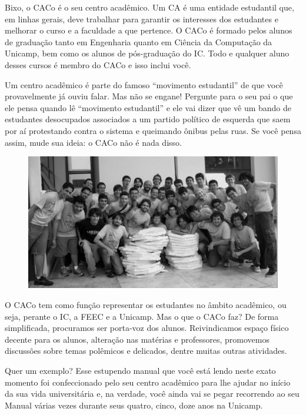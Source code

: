 Bixo, o CACo é o seu centro acadêmico. Um CA é uma entidade estudantil que, em
linhas gerais, deve trabalhar para garantir os interesses dos estudantes e
melhorar o curso e a faculdade a que pertence. O CACo é formado pelos alunos
de graduação tanto em Engenharia quanto em Ciência da Computação da Unicamp,
bem como os alunos de pós-graduação do IC. Todo e qualquer aluno desses cursos
é membro do CACo e isso inclui você.

Um centro acadêmico é parte do famoso ``movimento estudantil'' de que você
provavelmente já ouviu falar. Mas não se engane! Pergunte para o seu pai o que ele
pensa quando lê ``movimento estudantil'' e ele vai dizer que vê um bando de
estudantes desocupados associados a um partido político de esquerda que saem por
aí protestando contra o sistema e queimando ônibus pelas ruas. Se você pensa
assim, mude sua ideia: o CACo não é nada disso.

\begin{figure}[H]
    \centering
    \includegraphics[scale=0.22]{img/caco/pizzada.jpg}
\end{figure}

O CACo tem como função representar os estudantes no âmbito acadêmico, ou seja,
perante o IC, a FEEC e a Unicamp. Mas o que o CACo faz? De forma
simplificada, procuramos ser porta-voz dos alunos. Reivindicamos espaço físico
decente para os alunos, alteração nas matérias e professores, promovemos
discussões sobre temas polêmicos e delicados, dentre muitas outras atividades.

Quer um exemplo? Esse estupendo manual que você está lendo neste exato momento
foi confeccionado pelo seu centro acadêmico para lhe ajudar no início da sua
vida universitária e, na verdade, você ainda vai se pegar recorrendo ao seu
Manual várias vezes durante seus quatro, cinco, doze anos na Unicamp.

